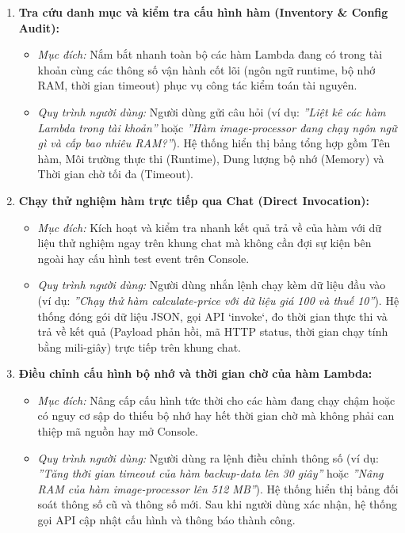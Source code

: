 \documentclass[a4paper,12pt]{article}
\begin{document}
\begin{enumerate}
  \item \textbf{Tra cứu danh mục và kiểm tra cấu hình hàm (Inventory \& Config Audit):}
  \begin{itemize}
    \item \textit{Mục đích:} Nắm bắt nhanh toàn bộ các hàm Lambda đang có trong tài khoản cùng các thông số vận hành cốt lõi (ngôn ngữ runtime, bộ nhớ RAM, thời gian timeout) phục vụ công tác kiểm toán tài nguyên.
    \item \textit{Quy trình người dùng:} Người dùng gửi câu hỏi (ví dụ: \textit{''Liệt kê các hàm Lambda trong tài khoản''} hoặc \textit{''Hàm image-processor đang chạy ngôn ngữ gì và cấp bao nhiêu RAM?''}). Hệ thống hiển thị bảng tổng hợp gồm Tên hàm, Môi trường thực thi (Runtime), Dung lượng bộ nhớ (Memory) và Thời gian chờ tối đa (Timeout).
  \end{itemize}

  \item \textbf{Chạy thử nghiệm hàm trực tiếp qua Chat (Direct Invocation):}
  \begin{itemize}
    \item \textit{Mục đích:} Kích hoạt và kiểm tra nhanh kết quả trả về của hàm với dữ liệu thử nghiệm ngay trên khung chat mà không cần đợi sự kiện bên ngoài hay cấu hình test event trên Console.
    \item \textit{Quy trình người dùng:} Người dùng nhắn lệnh chạy kèm dữ liệu đầu vào (ví dụ: \textit{''Chạy thử hàm calculate-price với dữ liệu giá 100 và thuế 10''}). Hệ thống đóng gói dữ liệu JSON, gọi API `invoke`, đo thời gian thực thi và trả về kết quả (Payload phản hồi, mã HTTP status, thời gian chạy tính bằng mili-giây) trực tiếp trên khung chat.
  \end{itemize}

  \item \textbf{Điều chỉnh cấu hình bộ nhớ và thời gian chờ của hàm Lambda:}
  \begin{itemize}
    \item \textit{Mục đích:} Nâng cấp cấu hình tức thời cho các hàm đang chạy chậm hoặc có nguy cơ sập do thiếu bộ nhớ hay hết thời gian chờ mà không phải can thiệp mã nguồn hay mở Console.
    \item \textit{Quy trình người dùng:} Người dùng ra lệnh điều chỉnh thông số (ví dụ: \textit{''Tăng thời gian timeout của hàm backup-data lên 30 giây''} hoặc \textit{''Nâng RAM của hàm image-processor lên 512 MB''}). Hệ thống hiển thị bảng đối soát thông số cũ và thông số mới. Sau khi người dùng xác nhận, hệ thống gọi API cập nhật cấu hình và thông báo thành công.
  \end{itemize}


\end{enumerate}
\end{document}
